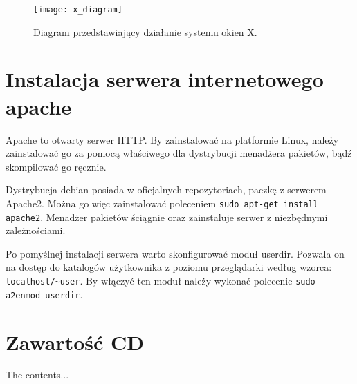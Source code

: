 \begin{appendices}
\begin{description}
\begin{figure}[H]
\begin{center}
    \texttt{[image: x\_diagram]}
\end{center}
\caption{Diagram przedstawiający działanie systemu okien X.}
\label{fig:x_diagram}
\end{figure}
	
\end{description}

\newpage
\section{Instalacja serwera internetowego apache}
\label{app:apache}
Apache to otwarty serwer HTTP. By zainstalować na platformie Linux, należy zainstalować go za pomocą właściwego dla dystrybucji menadżera pakietów, bądź skompilować go ręcznie. 
\par
Dystrybucja debian posiada w oficjalnych repozytoriach, paczkę z serwerem Apache2. Można go więc zainstalować poleceniem \lstinline{sudo apt-get install apache2}. Menadżer pakietów ściągnie oraz zainstaluje serwer z niezbędnymi zależnościami.
\par
Po pomyślnej instalacji serwera warto skonfigurować moduł userdir. Pozwala on na dostęp do katalogów użytkownika z poziomu przeglądarki według wzorca: \lstinline{localhost/~user}. By włączyć ten moduł należy wykonać polecenie \lstinline{sudo a2enmod userdir}.


\section{Zawartość CD}

The contents...

\end{appendices}

